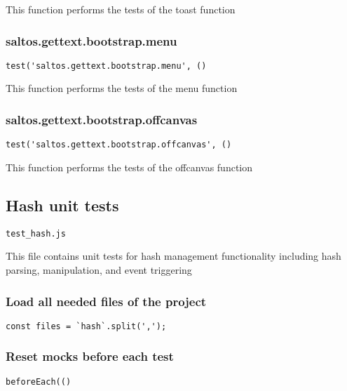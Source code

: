 \documentclass[a4paper]{article}
\begin{document}
This function performs the tests of the toast function

\hypertarget{toc186}{}
\subsubsection{saltos.gettext.bootstrap.menu}

\begin{lstlisting}
test('saltos.gettext.bootstrap.menu', ()
\end{lstlisting}

This function performs the tests of the menu function

\hypertarget{toc187}{}
\subsubsection{saltos.gettext.bootstrap.offcanvas}

\begin{lstlisting}
test('saltos.gettext.bootstrap.offcanvas', ()
\end{lstlisting}

This function performs the tests of the offcanvas function

\hypertarget{toc188}{}
\subsection{Hash unit tests}

\begin{lstlisting}
test_hash.js
\end{lstlisting}

This file contains unit tests for hash management functionality
including hash parsing, manipulation, and event triggering

\hypertarget{toc189}{}
\subsubsection{Load all needed files of the project}

\begin{lstlisting}
const files = `hash`.split(',');
\end{lstlisting}

\hypertarget{toc190}{}
\subsubsection{Reset mocks before each test}

\begin{lstlisting}
beforeEach(()
\end{lstlisting}
\end{document}
